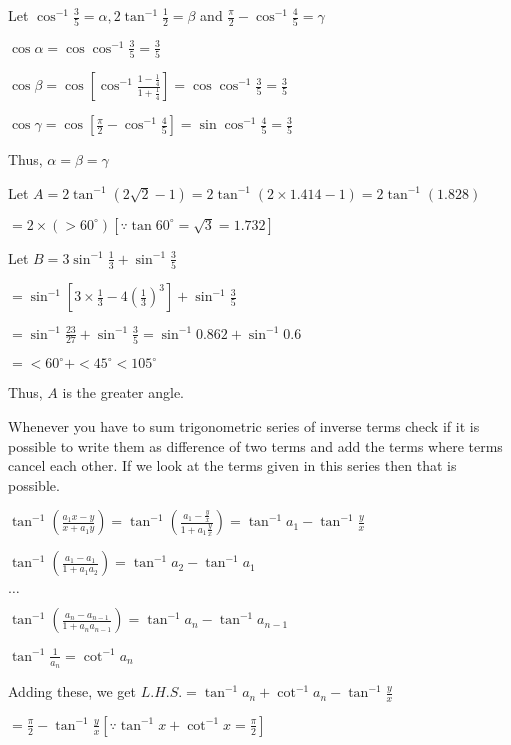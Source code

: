   Let $\cos^{-1}\frac{3}{5} = \alpha, 2\tan^{-1}\frac{1}{2} = \beta$ and $\frac{\pi}{2} - \cos^{-1}\frac{4}{5} =
  \gamma$

  $\cos\alpha = \cos\cos^{-1}\frac{3}{5} = \frac{3}{5}$

  $\cos\beta = \cos\left[\cos^{-1}\frac{1 - \frac{1}{4}}{1 + \frac{1}{4}}\right] = \cos\cos^{-1}\frac{3}{5} = \frac{3}{5}$

  $\cos\gamma = \cos\left[\frac{\pi}{2} - \cos^{-1}\frac{4}{5}\right] = \sin\cos^{-1}\frac{4}{5} = \frac{3}{5}$

  Thus, $\alpha = \beta = \gamma$

\item Let $A = 2\tan^{-1}(2\sqrt{2} - 1) = 2\tan^{-1}(2\times 1.414 - 1) = 2\tan^{-1}(1.828)$

  $= 2\times (> 60^\circ)[\because \tan60^\circ = \sqrt{3} = 1.732]$

  Let $B = 3\sin^{-1}\frac{1}{3} + \sin^{-1}\frac{3}{5}$

  $= \sin^{-1}\left[3\times\frac{1}{3} - 4\left(\frac{1}{3}\right)^3\right] + \sin^{-1}\frac{3}{5}$

  $= \sin^{-1}\frac{23}{27} + \sin^{-1}\frac{3}{5} = \sin^{-1}0.862 + \sin^{-1}0.6$

  $= <60^\circ + <45^\circ < 105^\circ$

  Thus, $A$ is the greater angle.

\item Whenever you have to sum trigonometric series of inverse terms check if it is possible to write them as difference of two terms
  and add the terms where terms cancel each other. If we look at the terms given in this series then that is possible.

  $\tan^{-1}\left(\frac{a_1x - y}{x + a_1y}\right) = \tan^{-1}\left(\frac{a_1 - \frac{y}{x}}{1 + a_1\frac{y}{x}}\right) =
  \tan^{-1}a_1 - \tan^{-1}\frac{y}{x}$

  $\tan^{-1}\left(\frac{a_1 - a_1}{1 + a_1a_2}\right) = \tan^{-1}a_2 - \tan^{-1}a_1$

  $\ldots$

  $\tan^{-1}\left(\frac{a_n - a_{n - 1}}{1 + a_na_{n - 1}}\right) = \tan^{-1}a_n - \tan^{-1}a_{n - 1}$

  $\tan^{-1}\frac{1}{a_n} = \cot^{-1}a_n$

  Adding these, we get $L.H.S. = \tan^{-1}a_n + \cot^{-1}a_n - \tan^{-1}\frac{y}{x}$

  $= \frac{\pi}{2} - \tan^{-1}\frac{y}{x}\left[\because\tan^{-1}x + \cot^{-1}x = \frac{\pi}{2}\right]$

